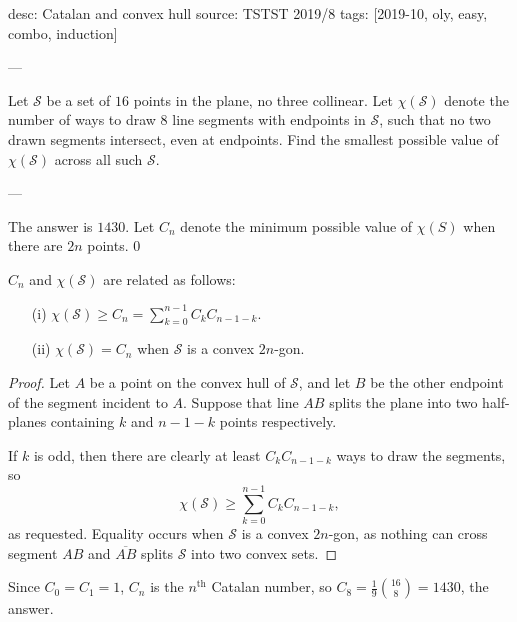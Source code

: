 desc: Catalan and convex hull
source: TSTST 2019/8
tags: [2019-10, oly, easy, combo, induction]

---

Let $\mathcal S$ be a set of $16$ points in the plane, no three collinear. Let $\chi(\mathcal S)$ denote the number of ways to draw $8$ line segments with endpoints in $\mathcal S$, such that no two drawn segments intersect, even at endpoints. Find the smallest possible value of $\chi(\mathcal S)$ across all such $\mathcal S$.

---

The answer is $1430$. Let $C_n$ denote the minimum possible value of $\chi(S)$ when there are $2n$ points.
\setcounter{iclaim}0
\begin{boxclaim}
    $C_n$ and $\chi(\mathcal S)$ are related as follows:
    \begin{itemize}
        \item[(i)] $\chi(\mathcal S)\ge C_n=\sum_{k=0}^{n-1}C_kC_{n-1-k}$.
        \item[(ii)] $\chi(\mathcal S)=C_n$ when $\mathcal S$ is a convex $2n$-gon.
    \end{itemize}
\end{boxclaim}
\begin{proof}
    Let $A$ be a point on the convex hull of $\mathcal S$, and let $B$ be the other endpoint of the segment incident to $A$. Suppose that line $AB$ splits the plane into two half-planes containing $k$ and $n-1-k$ points respectively.

    If $k$ is odd, then there are clearly at least $C_kC_{n-1-k}$ ways to draw the segments, so \[\chi(\mathcal S)\ge\sum_{k=0}^{n-1}C_kC_{n-1-k},\]
    as requested. Equality occurs when $\mathcal S$ is a convex $2n$-gon, as nothing can cross segment $AB$ and $\overline{AB}$ splits $\mathcal S$ into two convex sets.
\end{proof}

Since $C_0=C_1=1$, $C_n$ is the $n^\text{th}$ Catalan number, so $C_8=\tfrac19\binom{16}8=1430$, the answer.
